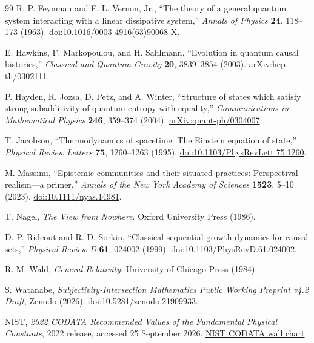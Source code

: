\documentclass[11pt]{article}
\theoremstyle{definition}
\theoremstyle{remark}
\begin{document}
\begin{thebibliography}{99}
R. P. Feynman and F. L. Vernon, Jr., ``The theory of a general quantum system interacting with a linear dissipative system,'' \emph{Annals of Physics} \textbf{24}, 118--173 (1963). \href{https://doi.org/10.1016/0003-4916(63)90068-X}{doi:10.1016/0003-4916(63)90068-X}.

E. Hawkins, F. Markopoulou, and H. Sahlmann, ``Evolution in quantum causal histories,'' \emph{Classical and Quantum Gravity} \textbf{20}, 3839--3854 (2003). \href{https://arxiv.org/abs/hep-th/0302111}{arXiv:hep-th/0302111}.

P. Hayden, R. Jozsa, D. Petz, and A. Winter, ``Structure of states which satisfy strong subadditivity of quantum entropy with equality,'' \emph{Communications in Mathematical Physics} \textbf{246}, 359--374 (2004). \href{https://arxiv.org/abs/quant-ph/0304007}{arXiv:quant-ph/0304007}.

T. Jacobson, ``Thermodynamics of spacetime: The Einstein equation of state,'' \emph{Physical Review Letters} \textbf{75}, 1260--1263 (1995). \href{https://doi.org/10.1103/PhysRevLett.75.1260}{doi:10.1103/PhysRevLett.75.1260}.

M. Massimi, ``Epistemic communities and their situated practices: Perspectival realism---a primer,'' \emph{Annals of the New York Academy of Sciences} \textbf{1523}, 5--10 (2023). \href{https://doi.org/10.1111/nyas.14981}{doi:10.1111/nyas.14981}.

T. Nagel, \emph{The View from Nowhere}. Oxford University Press (1986).

D. P. Rideout and R. D. Sorkin, ``Classical sequential growth dynamics for causal sets,'' \emph{Physical Review D} \textbf{61}, 024002 (1999). \href{https://doi.org/10.1103/PhysRevD.61.024002}{doi:10.1103/PhysRevD.61.024002}.

R. M. Wald, \emph{General Relativity}. University of Chicago Press (1984).

S. Watanabe, \emph{Subjectivity-Intersection Mathematics Public Working Preprint v4.2 Draft}, Zenodo (2026). \href{https://doi.org/10.5281/zenodo.21909933}{doi:10.5281/zenodo.21909933}.

NIST, \emph{2022 CODATA Recommended Values of the Fundamental Physical Constants}, 2022 release, accessed 25 September 2026. \href{https://www.physics.nist.gov/cuu/pdf/wall_2022.pdf}{NIST CODATA wall chart}.


\end{thebibliography}
\end{document}
